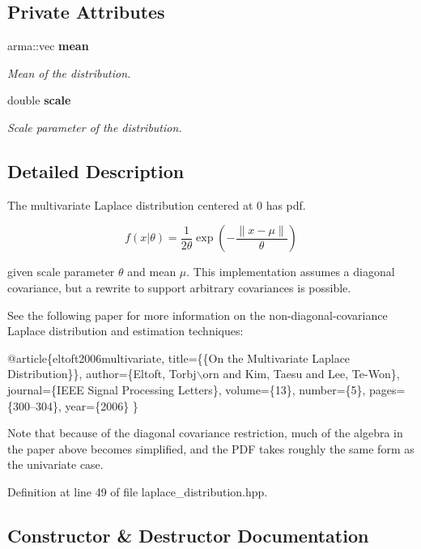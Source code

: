 \subsection*{Private Attributes}
\begin{DoxyCompactItemize}
\item 
arma\+::vec {\bf mean}
\begin{DoxyCompactList}\small\item\em Mean of the distribution. \end{DoxyCompactList}\item 
double {\bf scale}
\begin{DoxyCompactList}\small\item\em Scale parameter of the distribution. \end{DoxyCompactList}\end{DoxyCompactItemize}


\subsection{Detailed Description}
The multivariate Laplace distribution centered at 0 has pdf. 

\[ f(x|\theta) = \frac{1}{2 \theta}\exp\left(-\frac{\|x - \mu\|}{\theta}\right) \]

given scale parameter $\theta$ and mean $\mu$. This implementation assumes a diagonal covariance, but a rewrite to support arbitrary covariances is possible.

See the following paper for more information on the non-\/diagonal-\/covariance Laplace distribution and estimation techniques\+:


\begin{DoxyCode}
@article\{eltoft2006multivariate,
  title=\{\{On the Multivariate Laplace Distribution\}\},
  author=\{Eltoft, Torbj\(\backslash\)orn and Kim, Taesu and Lee, Te-Won\},
  journal=\{IEEE Signal Processing Letters\},
  volume=\{13\},
  number=\{5\},
  pages=\{300--304\},
  year=\{2006\}
\}
\end{DoxyCode}


Note that because of the diagonal covariance restriction, much of the algebra in the paper above becomes simplified, and the P\+DF takes roughly the same form as the univariate case. 

Definition at line 49 of file laplace\+\_\+distribution.\+hpp.



\subsection{Constructor \& Destructor Documentation}
